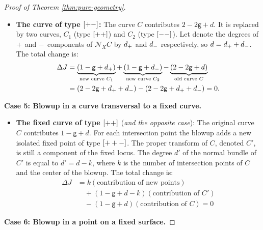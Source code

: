 \documentclass[10pt,a4paper]{amsart}
\newcommand{\lm}{\textup{\texttt{-}}}
\newcommand{\lp}{\textup{\texttt{+}}}
\begin{document}
\begin{proof}[Proof of Theorem \ref{thm:pure-geometry}]
\begin{itemize}
    \item \textbf{The curve of type $[\lp\lm]$:} The curve $C$ contributes $2 - 2\mathsf{g} + d$. It is replaced by two curves, $C_1$ (type $[\lp\lp]$) and $C_2$ (type $[\lm\lm]$). Let denote the degrees of $\lp$ and $\lm$ components of $\mathcal N_XC$ by $d_\lp$ and $d_\lm$ respectively, so $d = d_\lp + d_\lm$. The total change is:
    \begin{align}
        \Delta J &= \underbrace{(1 - \mathsf{g} + d_\lp)}_{\text{new curve } C_1} + \underbrace{(1 - \mathsf{g} + d_\lm)}_{\text{new curve } C_2} - \underbrace{(2 - 2\mathsf{g} + d)}_{\text{old curve } C} \\
        &= (2 - 2\mathsf{g} + d_\lp + d_\lm) - (2 - 2\mathsf{g} + d_\lp + d_\lm) = 0.
    \end{align}
\end{itemize}

\noindent \textbf{Case 5: Blowup in a curve transversal to a fixed curve.}
\begin{itemize}
    \item \textbf{The fixed curve of type $[\lp\lp]$} (\textit{and the opposite case}):  The original curve $C$ contributes $1-\mathsf{g}+d$. For each intersection point the blowup adds a new isolated fixed point of type $[\lp\lp\lm]$. The proper transform of $C$, denoted $C'$, is still a component of the fixed locus. The degree $d'$ of the normal bundle of $C'$ is equal to $d'=d-k$, where $k$ is the number of intersection points of $C$ and the center of the blowup. The total change is:
 \begin{align}
    \Delta J &= k (\text{contribution of new points}) \\
             &\quad + (1 - \mathsf g + d - k) (\text{contribution of } C') \\
             &\quad - (1 - \mathsf g + d) (\text{contribution of } C) = 0
\end{align}
\end{itemize}

\noindent \textbf{Case 6: Blowup in a point on a fixed surface.}


\end{proof}
\end{document}
